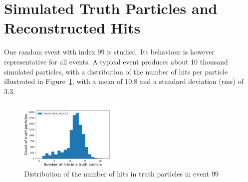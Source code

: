 \section{Simulated Truth Particles and Reconstructed Hits}

One random event with index 99 is studied. Its behaviour is however representative for all events. A typical event produces about 10 thousand simulated particles, with a distribution of the number of hits per particle illustrated in Figure~\ref{fig:TruthParticleNbHits}, with a mean of 10.8 and a standard deviation (rms) of 3.3.

\begin{figure}[htb]
\centering
\includegraphics[width=0.45\textwidth]{plots/DataExploration_histo_counterTruthParticles_vs_nbHitsInTruthParticle.pdf}
\caption{Distribution of the number of hits in truth particles in event 99}
\label{fig:TruthParticleNbHits}
\end{figure}


